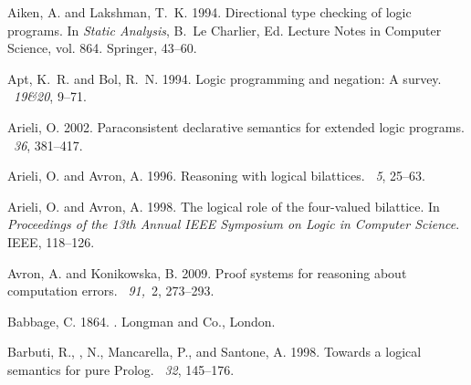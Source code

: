 \documentclass{tlp}
\begin{document}

\begin{thebibliography}{}

{\sc Aiken, A.} {\sc and} {\sc Lakshman, T.~K.} 1994.
\newblock Directional type checking of logic programs.
\newblock In {\em Static Analysis}, {B.~{Le Charlier}}, Ed. Lecture Notes in
  Computer Science, vol. 864. Springer, 43--60.

{\sc Apt, K.~R.} {\sc and} {\sc Bol, R.~N.} 1994.
\newblock Logic programming and negation: A survey.
~{\em 19\&20}, 9--71.

{\sc Arieli, O.} 2002.
\newblock Paraconsistent declarative semantics for extended logic programs.
~{\em 36},
  381--417.

{\sc Arieli, O.} {\sc and} {\sc Avron, A.} 1996.
\newblock Reasoning with logical bilattices.
~{\em 5}, 25--63.

{\sc Arieli, O.} {\sc and} {\sc Avron, A.} 1998.
\newblock The logical role of the four-valued bilattice.
\newblock In {\em Proceedings of the 13th Annual IEEE Symposium on Logic in
  Computer Science}. IEEE, 118--126.

{\sc Avron, A.} {\sc and} {\sc Konikowska, B.} 2009.
\newblock Proof systems for reasoning about computation errors.
~{\em 91,\/}~2, 273--293.

{\sc Babbage, C.} 1864.
.
\newblock Longman and Co., London.

{\sc Barbuti, R.}, {, N.}, {\sc Mancarella, P.}, {\sc and}
  {\sc Santone, A.} 1998.
\newblock Towards a logical semantics for pure {Prolog}.
~{\em 32}, 145--176.


\end{thebibliography}
\end{document}
